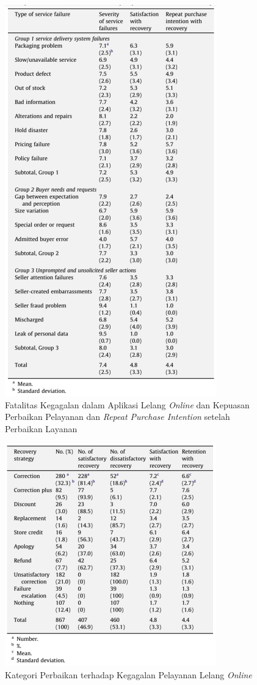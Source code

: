 	  \begin{figure}[H]
        \centering
        \includegraphics[height=\textheight]{images/bab3/Fatalitas-Kegagalan-Ecommerce.png}
        \caption{Fatalitas Kegagalan dalam Aplikasi Lelang \textit{Online} dan  Kepuasan Perbaikan Pelayanan dan \textit{Repeat Purchase Intention} setelah Perbaikan Layanan}
        \label{severity-failures}
      \end{figure}
      
	  \begin{figure}[H]
        \centering
        \includegraphics[width=\linewidth]{images/bab3/Solusi-Perbaikan-Ketidakpuasan.png}
        \caption{Kategori Perbaikan terhadap Kegagalan Pelayanan Lelang \textit{Online}}
        \label{service-recovery-strategies}
      \end{figure}
  